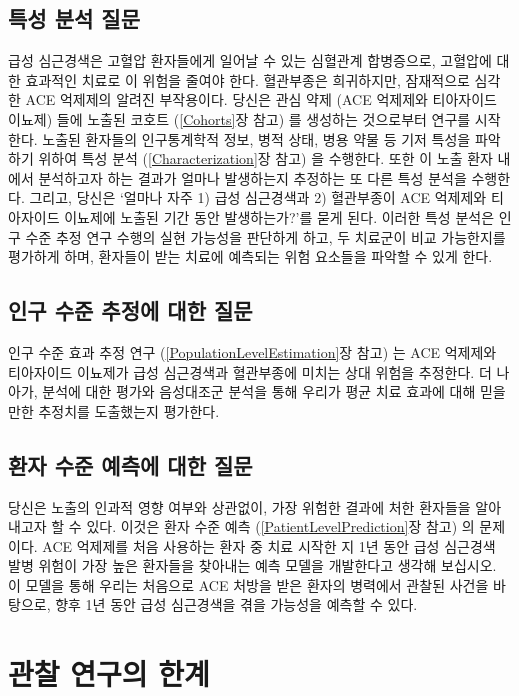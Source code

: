 \documentclass[11pt]{book}
\theoremstyle{definition}
\theoremstyle{definition}
\theoremstyle{definition}
\theoremstyle{remark}
\begin{document}
\subsection{특성 분석 질문}\label{--}

급성 심근경색은 고혈압 환자들에게 일어날 수 있는 심혈관계 합병증으로,
고혈압에 대한 효과적인 치료로 이 위험을 줄여야 한다. 혈관부종은
희귀하지만, 잠재적으로 심각한 ACE 억제제의 알려진 부작용이다. 당신은
관심 약제 (ACE 억제제와 티아자이드 이뇨제) 들에 노출된 코호트
(\ref{Cohorts}장 참고) 를 생성하는 것으로부터 연구를 시작한다. 노출된
환자들의 인구통계학적 정보, 병적 상태, 병용 약물 등 기저 특성을 파악하기
위하여 특성 분석 (\ref{Characterization}장 참고) 을 수행한다. 또한 이
노출 환자 내에서 분석하고자 하는 결과가 얼마나 발생하는지 추정하는 또
다른 특성 분석을 수행한다. 그리고, 당신은 `얼마나 자주 1) 급성
심근경색과 2) 혈관부종이 ACE 억제제와 티아자이드 이뇨제에 노출된 기간
동안 발생하는가?'를 묻게 된다. 이러한 특성 분석은 인구 수준 추정 연구
수행의 실현 가능성을 판단하게 하고, 두 치료군이 비교 가능한지를 평가하게
하며, 환자들이 받는 치료에 예측되는 위험 요소들을 파악할 수 있게 한다.

\subsection{인구 수준 추정에 대한 질문}\label{----}

인구 수준 효과 추정 연구 (\ref{PopulationLevelEstimation}장 참고) 는 ACE
억제제와 티아자이드 이뇨제가 급성 심근경색과 혈관부종에 미치는 상대
위험을 추정한다. 더 나아가, 분석에 대한 평가와 음성대조군 분석을 통해
우리가 평균 치료 효과에 대해 믿을 만한 추정치를 도출했는지 평가한다.

\subsection{환자 수준 예측에 대한 질문}\label{----}

당신은 노출의 인과적 영향 여부와 상관없이, 가장 위험한 결과에 처한
환자들을 알아내고자 할 수 있다. 이것은 환자 수준 예측
(\ref{PatientLevelPrediction}장 참고) 의 문제이다. ACE 억제제를 처음
사용하는 환자 중 치료 시작한 지 1년 동안 급성 심근경색 발병 위험이 가장
높은 환자들을 찾아내는 예측 모델을 개발한다고 생각해 보십시오. 이 모델을
통해 우리는 처음으로 ACE 처방을 받은 환자의 병력에서 관찰된 사건을
바탕으로, 향후 1년 동안 급성 심근경색을 겪을 가능성을 예측할 수 있다.

\section{관찰 연구의 한계}\label{--}
\end{document}
